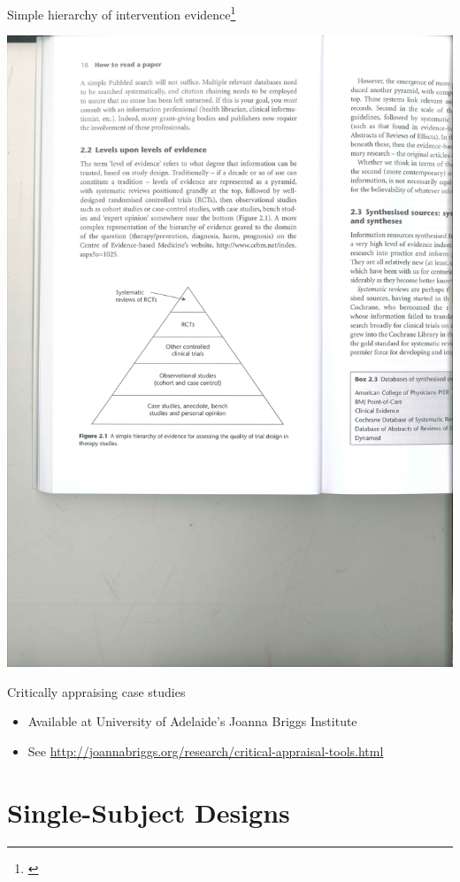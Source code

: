 \documentclass{beamer}
\begin{document}
% 
\begin{frame}{Simple hierarchy of intervention evidence\footnote{\tiny{\citet[p. 18]{Greenhalgh2010}}}}
	\begin{center}
	\includegraphics[width=.9\textwidth]{images/evidence_hierarchy_greenhalgh_4th.pdf}
	\end{center}
\end{frame}

%
\begin{frame}{Critically appraising case studies}
	\begin{itemize}
	\item Available at University of Adelaide's Joanna Briggs Institute
	\item See \url{http://joannabriggs.org/research/critical-appraisal-tools.html}
	\end{itemize}
\end{frame}

\section*{Single-Subject Designs}
\end{document}
